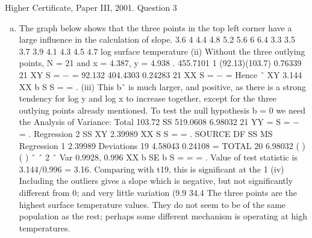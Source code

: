 \documentclass[a4paper,12pt]{article}
\begin{document}
Higher Certificate, Paper III, 2001. Question 3
\begin{enumerate}[(a)]
\item  The graph below shows that the three points in the top left corner have a large
influence in the calculation of slope.
3.6
4
4.4
4.8
5.2
5.6
6
6.4
3.3 3.5 3.7 3.9 4.1 4.3 4.5 4.7
log surface temperature
(ii) Without the three outlying points, N = 21 and x = 4.387, y = 4.938 .
455.7101 1 (92.13)(103.7) 0.76339
21 XY S = − =
92.132 404.4303 0.24283
21 XX S = − =
Hence ˆ XY 3.144
XX
b S
S
= = .
(iii) This bˆ is much larger, and positive, as there is a strong tendency for log y and
log x to increase together, except for the three outlying points already mentioned.
To test the null hypothesis b = 0 we need the Analysis of Variance:
Total
103.72 SS 519.0608 6.98032
21 YY = S = − = .
Regression
2
SS XY 2.39989
XX
S
S
= = .
SOURCE DF SS MS
Regression 1 2.39989
Deviations 19 4.58043 0.24108 = 
TOTAL 20 6.98032
( ) ( ) ˆ ˆ 2 ˆ Var 0.9928, 0.996
XX
b SE b
S
= \sigma = = .
Value of test statistic is 3.144/0.996 = 3.16. Comparing with t19, this is significant at
the 1%
(iv) Including the outliers gives a slope which is negative, but not significantly
different from 0; and very little variation (9.9%
34.4%
The three points are the highest surface temperature values. They do not seem to be
of the same population as the rest; perhaps some different mechanism is operating at
high temperatures.
\end{enumerate}
\end{document}
